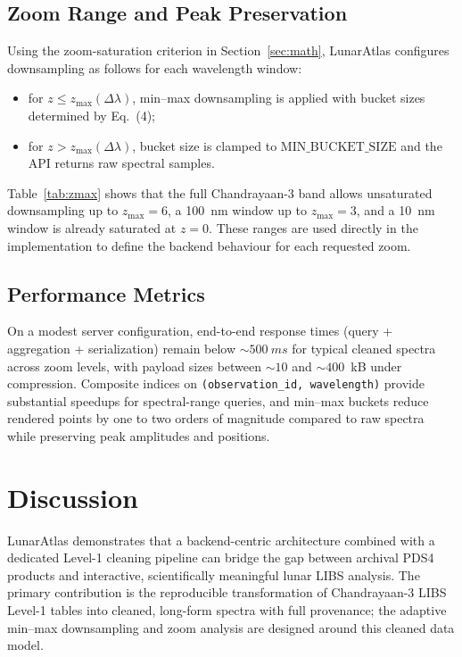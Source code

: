 \documentclass[12pt,a4paper]{article}
\begin{document}
\subsection{Zoom Range and Peak Preservation}

Using the zoom-saturation criterion in Section~\ref{sec:math}, LunarAtlas configures downsampling as follows for each wavelength window:

\begin{itemize}[nosep]
  \item for \(z \le z_{\max}(\Delta\lambda)\), min--max downsampling is applied with bucket sizes determined by Eq.~(4);
  \item for \(z > z_{\max}(\Delta\lambda)\), bucket size is clamped to \(\text{MIN\_BUCKET\_SIZE}\) and the API returns raw spectral samples.
\end{itemize}

Table~\ref{tab:zmax} shows that the full Chandrayaan-3 band allows unsaturated downsampling up to \(z_{\max}=6\), a 100~nm window up to \(z_{\max}=3\), and a 10~nm window is already saturated at \(z=0\). These ranges are used directly in the implementation to define the backend behaviour for each requested zoom.

\subsection{Performance Metrics}

On a modest server configuration, end-to-end response times (query + aggregation + serialization) remain below \(\sim \SI{500}{ms}\) for typical cleaned spectra across zoom levels, with payload sizes between \(\sim 10\) and \(\sim 400\)~kB under compression. Composite indices on \texttt{(observation\_id, wavelength)} provide substantial speedups for spectral-range queries, and min--max buckets reduce rendered points by one to two orders of magnitude compared to raw spectra while preserving peak amplitudes and positions.

\section{Discussion}
\label{sec:discussion}

LunarAtlas demonstrates that a backend-centric architecture combined with a dedicated Level-1 cleaning pipeline can bridge the gap between archival PDS4 products and interactive, scientifically meaningful lunar LIBS analysis. The primary contribution is the reproducible transformation of Chandrayaan-3 LIBS Level-1 tables into cleaned, long-form spectra with full provenance; the adaptive min--max downsampling and zoom analysis are designed around this cleaned data model.
\end{document}
